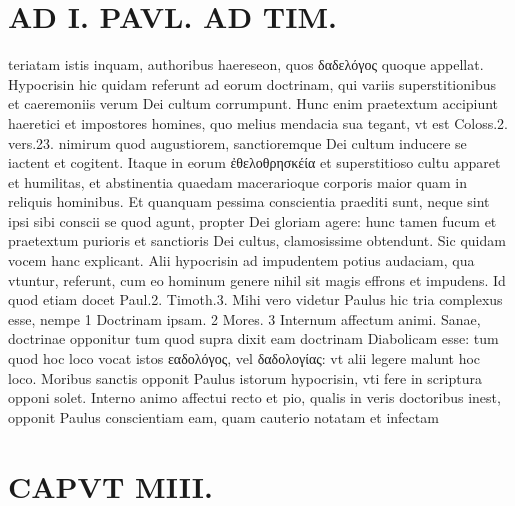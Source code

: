 \documentclass{article}
\begin{document}
\begin{pages}
\section*{AD I. PAVL. AD TIM. }
\marginpar{[ p.184 ]}\pstart teriatam istis inquam, authoribus haereseon, quos δαδελόγος quoque appellat. Hypocrisin hic quidam referunt ad eorum doctrinam, qui variis superstitionibus et caeremoniis verum Dei cultum corrumpunt. Hunc enim praetextum accipiunt haeretici et impostores homines, quo melius mendacia sua tegant, vt est Coloss.2. vers.23. nimirum quod augustiorem, sanctioremque Dei cultum inducere se iactent et cogitent. Itaque in eorum ἐθελοθρησκέία et superstitioso cultu apparet et humilitas, et abstinentia quaedam macerarioque corporis maior quam in reliquis hominibus. Et quanquam pessima conscientia praediti sunt, neque sint ipsi sibi conscii se quod agunt, propter Dei gloriam agere: hunc tamen fucum et praetextum purioris et sanctioris Dei cultus, clamosissime obtendunt. Sic quidam vocem hanc explicant. Alii hypocrisin ad impudentem potius audaciam, qua vtuntur, referunt, cum eo hominum genere nihil sit magis effrons et impudens. Id quod etiam docet Paul.2. Timoth.3. Mihi vero videtur Paulus hic tria complexus esse, nempe 1 Doctrinam ipsam. 2 Mores. 3 Internum affectum animi. Sanae, doctrinae opponitur tum quod supra dixit eam doctrinam Diabolicam esse: tum quod hoc loco vocat istos εαδολόγος, vel δαδολογίας: vt alii legere malunt hoc loco. Moribus sanctis opponit Paulus istorum hypocrisin, vti fere in scriptura opponi solet. Interno animo affectui recto et pio, qualis in veris doctoribus inest, opponit Paulus conscientiam eam, quam cauterio notatam et infectam  \pend
\section*{CAPVT  MIII. }
\marginpar{[ p.185 ]}\pstart {}
{}

\end{pages}
\end{document}
